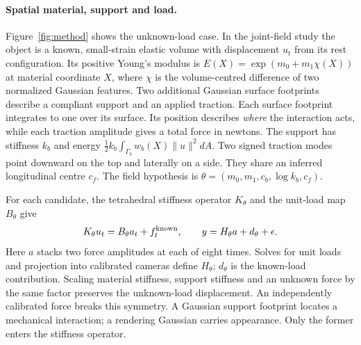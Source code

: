 \documentclass[10pt,twocolumn,letterpaper]{article}
\begin{document}
\paragraph{Spatial material, support and load.}
Figure~\ref{fig:method} shows the unknown-load case. In the joint-field study the object is a known, small-strain elastic volume with displacement $u_t$ from its rest configuration. Its positive Young's modulus is $E(X)=\exp(m_0+m_1\chi(X))$ at material coordinate $X$, where $\chi$ is the volume-centred difference of two normalized Gaussian features. Two additional Gaussian surface footprints describe a compliant support and an applied traction. Each surface footprint integrates to one over its surface. Its position describes \emph{where} the interaction acts, while each traction amplitude gives a total force in newtons. The support has stiffness $k_b$ and energy $\tfrac12 k_b\int_{\Gamma_b}w_b(X)\|u\|^2dA$. Two signed traction modes point downward on the top and laterally on a side. They share an inferred longitudinal centre $c_f$. The field hypothesis is $\theta=(m_0,m_1,c_b,\log k_b,c_f)$.

For each candidate, the tetrahedral stiffness operator $K_\theta$ and the unit-load map $B_\theta$ give
\begin{equation}
 K_\theta u_t=B_\theta a_t+f^{\rm known}_t,\qquad
 y=H_\theta a+d_\theta+\epsilon .
 \label{eq:forward}
\end{equation}
Here $a$ stacks two force amplitudes at each of eight times. Solves for unit loads and projection into calibrated cameras define $H_\theta$; $d_\theta$ is the known-load contribution. Scaling material stiffness, support stiffness and an unknown force by the same factor preserves the unknown-load displacement. An independently calibrated force breaks this symmetry. A Gaussian support footprint locates a mechanical interaction; a rendering Gaussian carries appearance. Only the former enters the stiffness operator.
\end{document}
